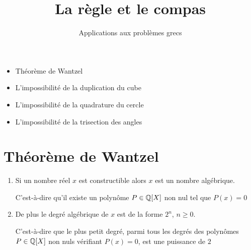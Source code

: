 


   





\title{{\bf La règle et le compas}}
\subtitle{Applications aux problèmes grecs}

\begin{frame}
  
  \debutmontitre

  \pause

{\footnotesize
\hfill
{}
\begin{minipage}{0.6\textwidth}
  \begin{itemize}
    \item<3-> Théorème de Wantzel
    \item<4-> L'impossibilité de la duplication du cube
    \item<5-> L'impossibilité de la quadrature du cercle
    \item<6-> L'impossibilité de la trisection des angles
  \end{itemize}
\end{minipage}
}

\end{frame}

\setcounter{framenumber}{0}

\section{Théorème de Wantzel}

\begin{frame}

\begin{theoreme}[de Wantzel]
\begin{enumerate}
  \item Si un nombre réel $x$ est constructible alors $x$ est un nombre algébrique. 
  
  \pause
  
  C'est-à-dire qu'il existe un polynôme $P \in \mathbb{Q}[X]$ non nul tel que $P(x)=0$
  
  \pause
  
  \item De plus le degré algébrique de $x$ est de la forme $2^n$, $n\ge 0$.
  
  \pause

  C'est-à-dire que le plus petit degré, parmi tous les degrés des polynômes 
  $P \in \mathbb{Q}[X]$ non nuls vérifiant $P(x)=0$, est une puissance de $2$
\end{enumerate}
\end{theoreme}

\end{frame}

